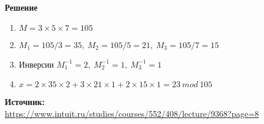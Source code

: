\documentclass[12pt,a4paper]{scrartcl}
\begin{document}
\textbf{Решение}

\begin{enumerate}
	\item $M = 3 \times 5 \times 7 = 105$
	
	\item $M_1 = 105/3 = 35,\ M_2 = 105/5 =21,\ M_3 = 105/7 = 15$
	
	\item Инверсии $M_1^{-1} = 2,\ M_2^{-1} = 1,\ M_3^{-1} = 1$
	
	\item $x = 2 \times 35 \times 2 + 3 \times 21 \times 1 + 2 \times 15 \times 1 = 23\ mod\ 105$
\end{enumerate}

\textbf{Источник:}\\

\href{https://www.intuit.ru/studies/courses/552/408/lecture/9368?page=8}{https://www.intuit.ru/studies/courses/552/408/lecture/9368?page=8}
	
\end{document}
